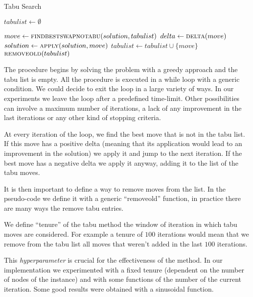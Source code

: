 \documentclass{article}
\begin{document}
\begin{algorithm}[h]
\caption{Tabu Search}
\label{alg:tabu}
\begin{algorithmic}
    \State{}
    \State $tabulist \gets \emptyset$

        \State $move \gets \Call{findbestswapnotabu}{solution, tabulist}$
        \State $delta \gets \Call{delta}{move}$
        \State $solution \gets \Call{apply}{solution, move}$
          \State $tabulist \gets tabulist \cup \{move\}$
        \EndIf
        \State $\Call{removeold}{tabulist}$
    \EndWhile

  \EndProcedure

\end{algorithmic}
\end{algorithm}

The procedure begins by solving the problem with a greedy approach and the tabu list
is empty. All the procedure is executed in a while loop with a generic condition. We could
decide to exit the loop in a large variety of ways. In our experiments we leave the loop
after a predefined time-limit. Other possibilities can involve a maximum number of iterations, a lack of any improvement in the last iterations or any other kind of stopping criteria.

At every iteration of the loop, we find the best move that is not in the tabu list. If this move has a positive delta (meaning that its application would lead to an
improvement in the solution) we apply it and jump to the next iteration. If the best
move has a negative delta we apply it anyway, adding it to the list of the tabu moves.

It is then important to define a way to remove moves from the list. In the pseudo-code we define it with a generic ``removeold'' function, in practice there are many ways the remove tabu entries.

We define ``tenure'' of the tabu method the window of iteration in which tabu moves are considered. For example a tenure of $100$ iterations would mean that we remove
from the tabu list all moves that weren't added in the last $100$ iterations.

This \textit{hyperparameter} is crucial for the effectiveness of the method. In our implementation we experimented with a fixed tenure (dependent on the number of
nodes of the instance) and with some functions of the number of the current iteration. Some good results were obtained with a sinusoidal function.
\end{document}
